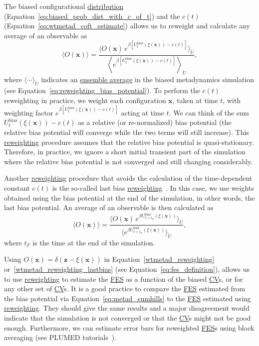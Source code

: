 \documentclass[9pt,review]{livecoms}
\newcommand{\vx}{\mathbf{x}}
\newcommand{\vz}{\mathbf{z}}
\begin{document}
The biased configurational \hyperlink{ref:Distribution} {distribution}  (Equation~\ref{eq:biased_prob_dist_with_c_of_t}) and the $c(t)$ (Equation~\ref{eq:wtmetad_coft_estimate}) allows us to reweight and calculate any average of an observable as
\begin{equation}
\label{wtmetad_reweighting}
\langle O(\vx) \rangle = \frac{\langle O(\vx)
\,
e^{
\beta\left[
U_{t}^{\mathrm{bias}}(\xi(\vx))-c(t)
\right]}\rangle_{\tilde U}}
{\left\langle
e^{\beta \left[
U_{t}^{\mathrm{bias}}(\xi(\vx))-c(t)
\right]} \right\rangle_{\tilde U}}, 
\end{equation}
where $\langle \cdots \rangle_{\tilde U}$ indicates an \hyperlink{ref:ensemble_average} {ensemble average} in the biased metadynamics simulation (see Equation~\ref{eq:reweighting_bias_potential}). To perform the $c(t)$ reweighting in practice, we weight each configuration $\vx$, taken at time $t$, with weighting factor $e^{\beta\left[U_{t}^{\mathrm{bias}}(\xi(\vx))-c(t)\right]}$ acting at time $t$. We can think of the sum $U_{t}^{\mathrm{bias}}(\xi(\vx))-c(t)$ as a relative (or re-normalized) bias potential (the relative bias potential will converge while the two terms will still increase). This \hyperlink{ref:Reweighting} {reweighting} procedure assumes that the relative bias potential is quasi-stationary. Therefore, in practice, we ignore a short initial transient part of the simulation where the relative bias potential is not converged and still changing considerably.


Another \hyperlink{ref:Reweighting} {reweighting} procedure that avoids the calculation of the time-dependent constant $c(t)$ is the so-called last bias \hyperlink{ref:Reweighting} {reweighting}~\cite{Branduardi-JCTC-2012}. In this case, we use weights obtained using the bias potential at the end of the simulation, in other words, the last bias potential. An average of an observable is then calculated as
\begin{equation}
\label{wtmetad_reweighting_lastbias}
\langle O(\vx) \rangle = \frac{\langle O(\vx)
\,
e^{
\beta
U_{t=t_F}^{\mathrm{bias}}(\xi(\vx))
}\rangle_{\tilde U}}
{\langle
e^{\beta
U_{t=t_F}^{\mathrm{bias}}(\xi(\vx))
} \rangle_{\tilde U}},
\end{equation}
where $t_F$ is the time at the end of the simulation. 

Using $O(\vx) = \delta(\vz-\xi(\vx))$ in Equation~\ref{wtmetad_reweighting} or~\ref{wtmetad_reweighting_lastbias} (see Equation~\ref{eq:fes_definition}), allows us to use \hyperlink{ref:Reweighting} {reweighting} to estimate the \hyperlink{ref:FES} {FES} as a function of the biased \hyperlink{ref:CV} {CV}s, or for any other set of \hyperlink{ref:CV} {CV}s. It is a good practice to compare the \hyperlink{ref:FES} {FES} estimated from the bias potential via Equation~\ref{eq:metad_sumhills} to the \hyperlink{ref:FES} {FES} estimated using \hyperlink{ref:Reweighting} {reweighting}. They should give the same results and a major disagreement would indicate that the simulation is not converged or that the \hyperlink{ref:CV} {CV}s might not be good enough. Furthermore, we can estimate error bars for reweighted \hyperlink{ref:FES} {FES}s using block averaging (see PLUMED tutorials~\cite{plumed_masterclass}).
\end{document}

